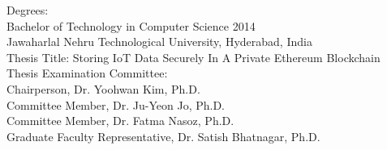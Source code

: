 \documentclass[11pt,openright]{report}
\begin{document}
\noindent Degrees:\\
\indent Bachelor of Technology in Computer Science 2014\\
\indent Jawaharlal Nehru Technological University, Hyderabad, India\\

\noindent Thesis Title: Storing IoT Data Securely In A     
Private Ethereum Blockchain\\

\noindent Thesis Examination Committee:\\
\indent Chairperson, Dr. Yoohwan Kim, Ph.D.\\
\indent Committee Member, Dr. Ju-Yeon Jo, Ph.D.\\
\indent Committee Member, Dr. Fatma Nasoz, Ph.D.\\
\indent Graduate Faculty Representative, Dr. Satish Bhatnagar, Ph.D.\\
\end{document}
